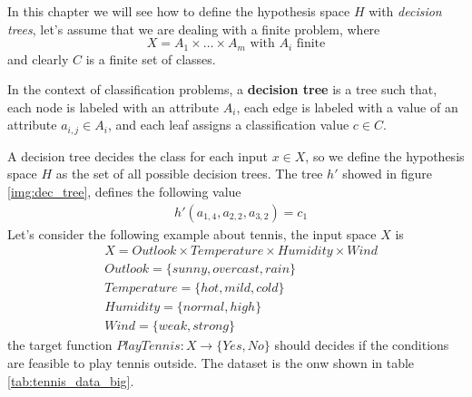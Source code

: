 \documentclass[10pt, letterpaper]{report}
\begin{document}
In this chapter we will see how to define the hypothesis space $H$ with \textit{decision trees}, let's assume that we are dealing with a finite problem, where \begin{equation}
    X=A_1\times \dots \times A_m \text{ with }A_i \text{ finite}
\end{equation}
and clearly $C$ is a finite set of classes.
\begin{definition}
    In the context of classification problems, a \textbf{decision tree} is a tree such that, each node is labeled with an attribute $A_i$, each edge is labeled with a value of an attribute $a_{i,j}\in A_i$, and each leaf assigns a classification value $c\in C$.
\end{definition}
A decision tree decides the class for each input $x\in X$, so we define the hypothesis space $H$ as the set of all possible decision trees.
The tree $h'$ showed in figure \ref{img:dec_tree}, defines the following value\begin{align}
    &h'(a_{1,4},a_{2,2},a_{3,2})=c_1
\end{align}
Let's consider the following example about tennis, the input space $X$ is\begin{align}
    &X = Outlook\times Temperature\times Humidity\times Wind\\
    &Outlook=\{sunny,overcast,rain\}\\
    &Temperature=\{hot,mild,cold\}\\
    &Humidity=\{normal,high\}\\
    &Wind=\{weak,strong\}
\end{align}
the target function $PlayTennis:X\rightarrow\{Yes,No\}$ should decides if the conditions are feasible to play tennis outside. The dataset is the onw shown in table \ref{tab:tennis_data_big}.
\end{document}
